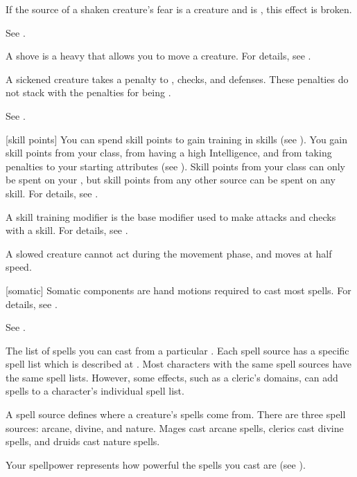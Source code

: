 If the source of a shaken creature's fear is a creature and is , this effect is broken.

 See .

 A shove is a heavy  that allows you to move a creature.
For details, see .

 A sickened creature takes a  penalty to , checks, and defenses.
These penalties do not stack with the penalties for being \nauseated.

 See .

[skill points] You can spend skill points to gain training in skills (see ).
You gain skill points from your class, from having a high Intelligence, and from taking penalties to your starting attributes (see ).
Skill points from your class can only be spent on your , but skill points from any other source can be spent on any skill.
For details, see .

 A skill training modifier is the base modifier used to make attacks and checks with a skill.
For details, see .

 A slowed creature cannot act during the movement phase, and moves at half speed.

[somatic] Somatic components are hand motions required to cast most spells.
For details, see .

 See .

 The list of spells you can cast from a particular .
Each spell source has a specific spell list which is described at .
Most characters with the same spell sources have the same spell lists.
However, some effects, such as a cleric's domains, can add spells to a character's individual spell list.

 A spell source defines where a creature's spells come from.
There are three spell sources: arcane, divine, and nature.
Mages cast arcane spells, clerics cast divine spells, and druids cast nature spells.

 Your spellpower represents how powerful the spells you cast are (see ).


